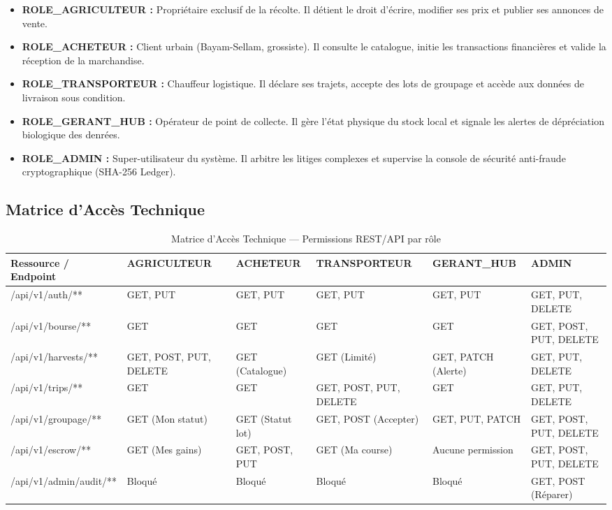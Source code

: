 \documentclass[12pt,a4paper]{report}
\begin{document}
\begin{itemize}
  \item \textbf{ROLE\_AGRICULTEUR :} Propriétaire exclusif de la récolte. Il détient le droit d'écrire, modifier ses prix et publier ses annonces de vente.
  \item \textbf{ROLE\_ACHETEUR :} Client urbain (Bayam-Sellam, grossiste). Il consulte le catalogue, initie les transactions financières et valide la réception de la marchandise.
  \item \textbf{ROLE\_TRANSPORTEUR :} Chauffeur logistique. Il déclare ses trajets, accepte des lots de groupage et accède aux données de livraison sous condition.
  \item \textbf{ROLE\_GERANT\_HUB :} Opérateur de point de collecte. Il gère l'état physique du stock local et signale les alertes de dépréciation biologique des denrées.
  \item \textbf{ROLE\_ADMIN :} Super-utilisateur du système. Il arbitre les litiges complexes et supervise la console de sécurité anti-fraude cryptographique (SHA-256 Ledger).
\end{itemize}

\subsection{Matrice d'Accès Technique}

\begin{table}[H]
\centering
\caption{Matrice d'Accès Technique — Permissions REST/API par rôle}
\scriptsize
\begin{tabularx}{\textwidth}{L{3.5cm} C{1.9cm} C{1.9cm} C{1.9cm} C{2cm} C{2cm}}
\toprule
\textbf{Ressource / Endpoint} & \textbf{AGRICULTEUR} & \textbf{ACHETEUR} & \textbf{TRANSPORTEUR} & \textbf{GERANT\_HUB} & \textbf{ADMIN} \\
\midrule
/api/v1/auth/** & GET, PUT & GET, PUT & GET, PUT & GET, PUT & GET, PUT, DELETE \\
/api/v1/bourse/** & GET & GET & GET & GET & GET, POST, PUT, DELETE \\
/api/v1/harvests/** & GET, POST, PUT, DELETE & GET (Catalogue) & GET (Limité) & GET, PATCH (Alerte) & GET, PUT, DELETE \\
/api/v1/trips/** & GET & GET & GET, POST, PUT, DELETE & GET & GET, PUT, DELETE \\
/api/v1/groupage/** & GET (Mon statut) & GET (Statut lot) & GET, POST (Accepter) & GET, PUT, PATCH & GET, POST, PUT, DELETE \\
/api/v1/escrow/** & GET (Mes gains) & GET, POST, PUT & GET (Ma course) & Aucune permission & GET, POST, PUT, DELETE \\
/api/v1/admin/audit/** & Bloqué & Bloqué & Bloqué & Bloqué & GET, POST (Réparer) \\
\bottomrule
\end{tabularx}
\end{table}
\end{document}
